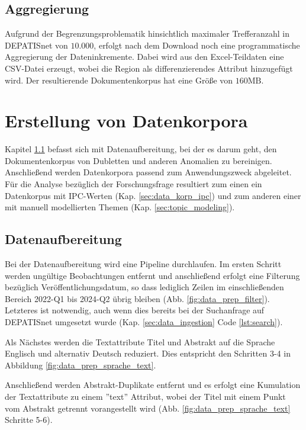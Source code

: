 \subsection{Aggregierung}

Aufgrund der Begrenzungsproblematik hinsichtlich maximaler Trefferanzahl in DEPATISnet von $10.000$, erfolgt nach dem Download noch eine programmatische Aggregierung der Dateninkremente. Dabei wird aus den Excel-Teildaten eine CSV-Datei erzeugt, wobei die Region als differenzierendes Attribut hinzugefügt wird. Der resultierende Dokumentenkorpus hat eine Größe von $160\text{MB}$.

\newpage
\section{Erstellung von Datenkorpora}
Kapitel \ref{sec:data_prep} befasst sich mit Datenaufbereitung, bei der es darum geht, den Dokumentenkorpus von Dubletten und anderen Anomalien zu bereinigen. Anschließend werden Datenkorpora passend zum Anwendungszweck abgeleitet. Für die Analyse bezüglich der Forschungsfrage resultiert zum einen ein Datenkorpus mit IPC-Werten (Kap. \ref{sec:data_korp_ipc}) und zum anderen einer mit manuell modellierten Themen (Kap. \ref{sec:topic_modeling}).


\subsection{Datenaufbereitung}\label{sec:data_prep}

Bei der Datenaufbereitung wird eine Pipeline durchlaufen. Im ersten Schritt werden ungültige Beobachtungen entfernt und anschließend erfolgt eine Filterung bezüglich Veröffentlichungsdatum, so dass lediglich Zeilen im einschließenden Bereich 2022-Q1 bis 2024-Q2 übrig bleiben (Abb. \ref{fig:data_prep_filter}). Letzteres ist notwendig, auch wenn dies bereits bei der Suchanfrage auf \ac{DEPATIS}net umgesetzt wurde (Kap. \ref{sec:data_ingestion} Code \ref{lst:search}). 

Als Nächstes werden die Textattribute Titel und Abstrakt auf die Sprache Englisch und alternativ Deutsch reduziert. Dies entspricht den Schritten 3-4 in Abbildung \ref{fig:data_prep_sprache_text}.

Anschließend werden Abstrakt-Duplikate entfernt und es erfolgt eine Kumulation der Textattribute zu einem ''text'' Attribut, wobei der Titel mit einem Punkt vom Abstrakt getrennt vorangestellt wird (Abb. \ref{fig:data_prep_sprache_text} Schritte 5-6).

